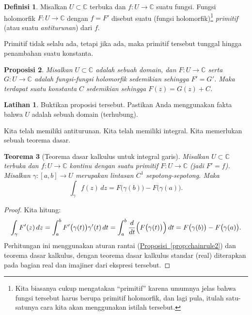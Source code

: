 \documentclass[12pt,openany]{book}
\newcommand{\C}{{\mathbb{C}}}
\newcommand{\myindex}[1]{#1\index{#1}}
\newcommand{\myquote}[1]{``#1''}
\theoremstyle{plain}
\newtheorem{thm}{Teorema}[section]
\newtheorem{prop}[thm]{Proposisi}
\theoremstyle{remark}
\theoremstyle{definition}
\newtheorem{defn}[thm]{Definisi}
\newenvironment{exbox}{%
    \def\FrameCommand{\vrule width 1pt \relax\hspace{10pt}}%
    \MakeFramed{\advance\hsize-\width\FrameRestore}%
}{%
    \endMakeFramed
}
\theoremstyle{exercise}
\newtheorem{exercise}{Latihan}[section]
\theoremstyle{example}
\newcommand{\propref}[1]{\hyperref[#1]{Proposisi~\ref*{#1}}}
\begin{document}
\begin{defn}
Misalkan $U \subset \C$ terbuka dan $f \colon U \to \C$
suatu fungsi.  Fungsi holomorfik $F \colon U \to \C$ dengan $f = F'$
disebut suatu (fungsi holomorfik)\footnote{%
Kita biasanya cukup mengatakan \myquote{primitif} karena umumnya jelas bahwa fungsi tersebut harus berupa
primitif holomorfik, dan lagi pula, itulah satu-satunya cara kita akan menggunakan
istilah tersebut.}
\emph{\myindex{primitif}} (atau suatu \emph{\myindex{antiturunan}})
dari $f$.
\end{defn}

Primitif tidak selalu ada, tetapi jika ada, maka primitif tersebut tunggal hingga
penambahan suatu konstanta.

\begin{prop} \label{prop:primunique}
Misalkan $U \subset \C$ adalah sebuah domain, dan
$F \colon U \to \C$ serta
$G \colon U \to \C$ adalah fungsi-fungsi holomorfik sedemikian sehingga $F' = G'$.  Maka
terdapat suatu konstanta $C$ sedemikian sehingga
$F(z) = G(z) + C$.
\end{prop}

\begin{exbox}
\begin{exercise}
Buktikan proposisi tersebut.
Pastikan Anda menggunakan fakta bahwa $U$ adalah sebuah domain (terhubung).
\end{exercise}
\end{exbox}

Kita telah memiliki antiturunan.  Kita telah memiliki integral.  Kita memerlukan
sebuah teorema dasar.

\begin{thm}[Teorema dasar kalkulus untuk integral garis]
%
Misalkan $U \subset \C$ terbuka dan $f \colon U \to \C$
kontinu dengan suatu primitif $F \colon U \to \C$ (jadi $F' = f$).
Misalkan $\gamma \colon [a,b] \to U$ merupakan lintasan $C^1$ sepotong-sepotong.
Maka
\begin{equation*}
\int_\gamma f(z) \, dz =
F\bigl( \gamma(b) \bigr) - F\bigl( \gamma(a)
\bigr) .
\end{equation*}
\end{thm}

\begin{proof}
Kita hitung:
\begin{equation*}
\int_\gamma F'(z) \, dz
=
\int_a^b F'\bigl(\gamma(t)\bigr) \gamma'(t) \, dt 
=
\int_a^b \frac{d}{dt} \Bigl( F\bigl(\gamma(t)\bigr) \Bigr) \, dt 
=
F\bigl( \gamma(b) \bigr) - F\bigl( \gamma(a) \bigr) .
\end{equation*}
Perhitungan ini menggunakan aturan rantai (\propref{prop:chainrule2})
dan teorema dasar kalkulus, dengan
teorema dasar kalkulus standar (real) diterapkan pada bagian real dan imajiner
dari ekspresi tersebut.
\end{proof}
\end{document}
